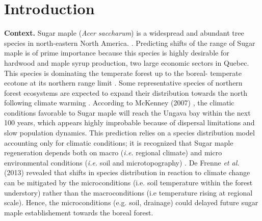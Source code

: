 


\newpage
\setcounter{page}{1}

\section{Introduction}

\textbf{Context.} Sugar maple (\textit{Acer saccharum}) is a widespread and
abundant tree species in north-eastern North America.
\cite{Graignic2013,Messaoud2007,Kellman2004,Barras1998}. Predicting shifts of
the range of Sugar maple is of prime importance because this species is highly
desirable for hardwood and maple syrup production, two large economic sectors
in Quebec. This species is dominating the temperate forest up to the boreal-
temperate ecotone at its northern range limit \cite{Barras1998}. Some
representative species of northern forest ecosystems are expected to expand
their distribution towards the north following climate warming
\cite{Sciences2014,Iverson2002}. According to McKenney (2007)
\cite{Sciences2014}, the climatic conditions  favorable to Sugar maple  will
reach the Ungava bay within the next 100 years, which appears highly
improbable because of dispersal limitations and slow population dynamics. This
prediction relies on a species distribution model accounting only for climatic
conditions; it is recognized that Sugar maple regeneration depends both on
macro  (\textit{i.e.} regional climate) and micro environmental conditions
(\textit{i.e.} soil and microtopography) \cite{Graignic2013,Lafleur2010}. De
Frenne \textit{et al.} (2013) revealed that shifts in species distribution in
reaction to climate change can be mitigated by the microconditions (i.e. soil
temperature within the forest understory) rather than the macroconditions (i.e
temperature rising at regional scale). Hence, the microconditions (e.g. soil,
drainage) could delayed future sugar maple establishement towards the boreal
forest.\\

